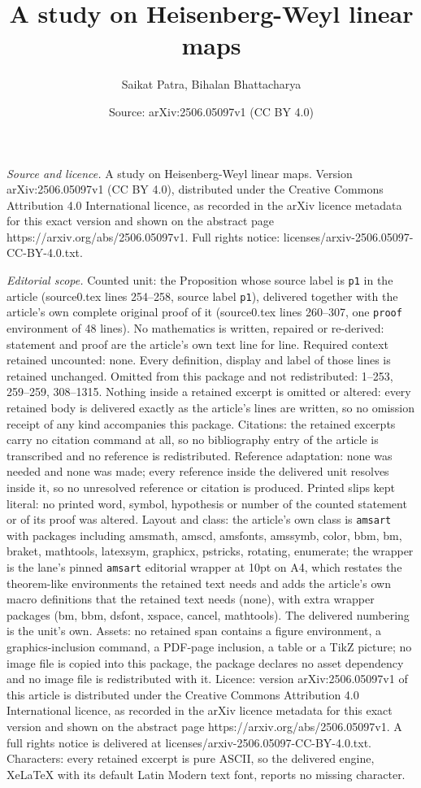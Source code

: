 \documentclass[10pt,a4paper]{amsart}
\title[A study on Heisenberg-Weyl linear maps]{A study on Heisenberg-Weyl linear maps}
\author{Saikat Patra, Bihalan Bhattacharya}
\date{Source: arXiv:2506.05097v1 (CC BY 4.0)}
\begin{document}
\maketitle

\noindent\emph{Source and licence.} A study on Heisenberg-Weyl linear maps. Version arXiv:2506.05097v1 (CC BY 4.0), distributed under the Creative Commons Attribution 4.0 International licence, as recorded in the arXiv licence metadata for this exact version and shown on the abstract page https://arxiv.org/abs/2506.05097v1. Full rights notice: licenses/arxiv-2506.05097-CC-BY-4.0.txt.\par\smallskip

\noindent\textit{Editorial scope.} Counted unit: the Proposition whose source label is \texttt{p1} in the article (source0.tex lines 254--258, source label \texttt{p1}), delivered together with the article's own complete original proof of it (source0.tex lines 260--307, one \texttt{proof} environment of 48 lines). No mathematics is written, repaired or re-derived: statement and proof are the article's own text line for line. Required context retained uncounted: none. Every definition, display and label of those lines is retained unchanged. Omitted from this package and not redistributed: 1--253, 259--259, 308--1315. Nothing inside a retained excerpt is omitted or altered: every retained body is delivered exactly as the article's lines are written, so no omission receipt of any kind accompanies this package. Citations: the retained excerpts carry no citation command at all, so no bibliography entry of the article is transcribed and no reference is redistributed. Reference adaptation: none was needed and none was made; every reference inside the delivered unit resolves inside it, so no unresolved reference or citation is produced. Printed slips kept literal: no printed word, symbol, hypothesis or number of the counted statement or of its proof was altered. Layout and class: the article's own class is \texttt{amsart} with packages including amsmath, amscd, amsfonts, amssymb, color, bbm, bm, braket, mathtools, latexsym, graphicx, pstricks, rotating, enumerate; the wrapper is the lane's pinned \texttt{amsart} editorial wrapper at 10pt on A4, which restates the theorem-like environments the retained text needs and adds the article's own macro definitions that the retained text needs (none), with extra wrapper packages (bm, bbm, dsfont, xspace, cancel, mathtools). The delivered numbering is the unit's own. Assets: no retained span contains a figure environment, a graphics-inclusion command, a PDF-page inclusion, a table or a TikZ picture; no image file is copied into this package, the package declares no asset dependency and no image file is redistributed with it. Licence: version arXiv:2506.05097v1 of this article is distributed under the Creative Commons Attribution 4.0 International licence, as recorded in the arXiv licence metadata for this exact version and shown on the abstract page https://arxiv.org/abs/2506.05097v1. A full rights notice is delivered at licenses/arxiv-2506.05097-CC-BY-4.0.txt. Characters: every retained excerpt is pure ASCII, so the delivered engine, XeLaTeX with its default Latin Modern text font, reports no missing character.
\end{document}
